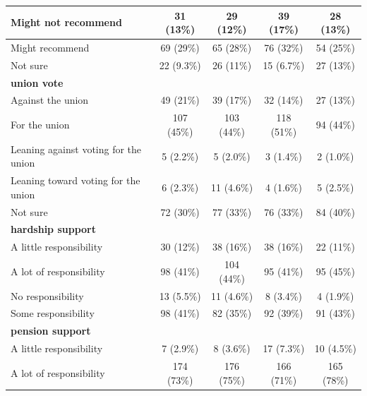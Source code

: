 \documentclass[
  11pt,
  oneside]{article}
\begin{document}
\begin{table}
\begin{tabular}[t]{l|c|c|c|c}
\hline
\hspace{1em}Might not recommend & 31 (13\%) & 29 (12\%) & 39 (17\%) & 28 (13\%)\\
\hline
\hspace{1em}Might recommend & 69 (29\%) & 65 (28\%) & 76 (32\%) & 54 (25\%)\\
\hline
\hspace{1em}Not sure & 22 (9.3\%) & 26 (11\%) & 15 (6.7\%) & 27 (13\%)\\
\hline
\textbf{union vote} &  &  &  & \\
\hline
\hspace{1em}Against the union & 49 (21\%) & 39 (17\%) & 32 (14\%) & 27 (13\%)\\
\hline
\hspace{1em}For the union & 107 (45\%) & 103 (44\%) & 118 (51\%) & 94 (44\%)\\
\hline
\hspace{1em}Leaning against voting for the union & 5 (2.2\%) & 5 (2.0\%) & 3 (1.4\%) & 2 (1.0\%)\\
\hline
\hspace{1em}Leaning toward voting for the union & 6 (2.3\%) & 11 (4.6\%) & 4 (1.6\%) & 5 (2.5\%)\\
\hline
\hspace{1em}Not sure & 72 (30\%) & 77 (33\%) & 76 (33\%) & 84 (40\%)\\
\hline
\textbf{hardship support} &  &  &  & \\
\hline
\hspace{1em}A little responsibility & 30 (12\%) & 38 (16\%) & 38 (16\%) & 22 (11\%)\\
\hline
\hspace{1em}A lot of responsibility & 98 (41\%) & 104 (44\%) & 95 (41\%) & 95 (45\%)\\
\hline
\hspace{1em}No responsibility & 13 (5.5\%) & 11 (4.6\%) & 8 (3.4\%) & 4 (1.9\%)\\
\hline
\hspace{1em}Some responsibility & 98 (41\%) & 82 (35\%) & 92 (39\%) & 91 (43\%)\\
\hline
\textbf{pension support} &  &  &  & \\
\hline
\hspace{1em}A little responsibility & 7 (2.9\%) & 8 (3.6\%) & 17 (7.3\%) & 10 (4.5\%)\\
\hline
\hspace{1em}A lot of responsibility & 174 (73\%) & 176 (75\%) & 166 (71\%) & 165 (78\%)\\

\end{tabular}
\end{table}
\end{document}
